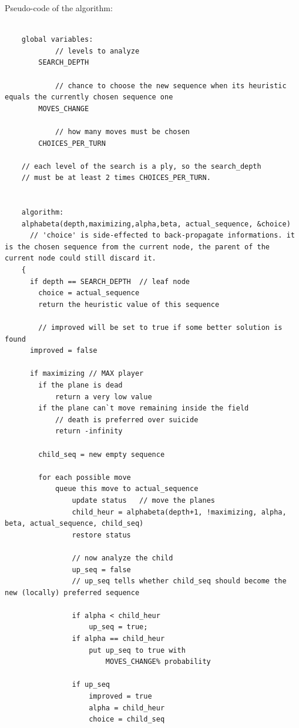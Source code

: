 Pseudo-code of the algorithm:
{\footnotesize
  \lstset{language=C}
  \begin{lstlisting}[frame=shadowbox,breaklines]
  	
    global variables:
    		// levels to analyze
    	SEARCH_DEPTH
        
        	// chance to choose the new sequence when its heuristic equals the currently chosen sequence one
        MOVES_CHANGE
        
        	// how many moves must be chosen
        CHOICES_PER_TURN
    
    // each level of the search is a ply, so the search_depth
    // must be at least 2 times CHOICES_PER_TURN.
    
    
    algorithm:
    alphabeta(depth,maximizing,alpha,beta, actual_sequence, &choice)
      // 'choice' is side-effected to back-propagate informations. it is the chosen sequence from the current node, the parent of the current node could still discard it.
    { 
      if depth == SEARCH_DEPTH	// leaf node
      	choice = actual_sequence
        return the heuristic value of this sequence
      
      	// improved will be set to true if some better solution is found
      improved = false
      
      if maximizing	// MAX player
      	if the plane is dead
        	return a very low value
        if the plane can`t move remaining inside the field
        	// death is preferred over suicide
        	return -infinity
        
        child_seq = new empty sequence
        
        for each possible move
        	queue this move to actual_sequence
                update status	// move the planes
                child_heur = alphabeta(depth+1, !maximizing, alpha, beta, actual_sequence, child_seq)
                restore status
        	
                // now analyze the child
                up_seq = false
                // up_seq tells whether child_seq should become the new (locally) preferred sequence
                
                if alpha < child_heur
                	up_seq = true;
                if alpha == child_heur
                	put up_seq to true with
                        MOVES_CHANGE% probability
                        
                if up_seq
                	improved = true
                	alpha = child_heur
                	choice = child_seq
                

\end{lstlisting}}
